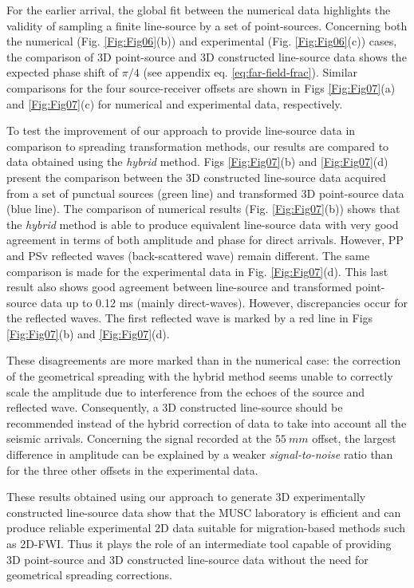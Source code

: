 \documentclass[extra,mreferee]{gji}
\begin{document}
For the earlier arrival, the global fit between the numerical data highlights the validity of sampling a finite line-source by a set of point-sources. Concerning both the numerical (Fig. \ref{Fig:Fig06}(b)) and experimental (Fig. \ref{Fig:Fig06}(c)) cases, the comparison of 3D point-source and 3D constructed line-source data shows the expected phase shift of $\pi/4$ (see appendix eq. \ref{eq:far-field-frac}). Similar comparisons for the four source-receiver offsets are shown in Figs \ref{Fig:Fig07}(a) and \ref{Fig:Fig07}(c) for numerical and experimental data, respectively.

To test the improvement of our approach to provide line-source data in comparison to spreading transformation methods, our results are compared to data obtained using the \textit{hybrid} method. Figs \ref{Fig:Fig07}(b) and \ref{Fig:Fig07}(d) present the comparison between the 3D constructed line-source data acquired from a set of punctual sources (green line) and transformed 3D point-source data (blue line). The comparison of numerical results (Fig. \ref{Fig:Fig07}(b)) shows that the \textit{hybrid} method is able to produce equivalent line-source data with very good agreement in terms of both amplitude and phase for direct arrivals. However, PP and PSv reflected waves (back-scattered wave) remain different. The same comparison is made for the experimental data in Fig. \ref{Fig:Fig07}(d). This last result also shows good agreement between line-source and transformed point-source data up to 0.12 ms (mainly direct-waves). However, discrepancies occur for the reflected waves. The first reflected wave is marked by a red line in Figs \ref{Fig:Fig07}(b) and \ref{Fig:Fig07}(d).

These disagreements are more marked than in the numerical case: the correction of the geometrical spreading with the hybrid method seems unable to correctly scale the amplitude due to interference from the echoes of the source and reflected wave. Consequently, a 3D constructed line-source should be recommended instead of the hybrid correction of data to take into account all the seismic arrivals. Concerning the signal recorded at the $55\ mm$ offset, the largest difference in amplitude can be explained by a weaker \textit{signal-to-noise} ratio than for the three other offsets in the experimental data. 

These results obtained using our approach to generate 3D  experimentally constructed line-source data show that the MUSC laboratory is efficient and can produce reliable experimental 2D data suitable for migration-based methods such as 2D-FWI. Thus it plays the role of an intermediate tool capable of providing 3D point-source and 3D constructed line-source data without the need for geometrical spreading corrections.
\end{document}
